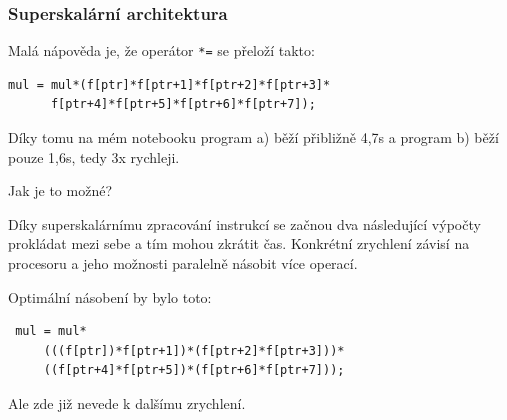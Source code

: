 \documentclass{beamer}
\begin{document}
\begin{frame}[fragile]
\frametitle{Superskalární architektura}

Malá nápověda je, že operátor \texttt{*=} se přeloží takto:
\begin{verbatim}
mul = mul*(f[ptr]*f[ptr+1]*f[ptr+2]*f[ptr+3]*
      f[ptr+4]*f[ptr+5]*f[ptr+6]*f[ptr+7]);
\end{verbatim}

Díky tomu na mém notebooku program a) běží přibližně 4,7s a program b) běží pouze 1,6s, tedy 3x rychleji.
\bigskip

Jak je to možné?
\bigskip

Díky superskalárnímu zpracování instrukcí se začnou dva následující výpočty prokládat mezi sebe a tím mohou zkrátit čas. Konkrétní zrychlení závisí na procesoru a jeho možnosti paralelně násobit více operací.
\bigskip

Optimální násobení by bylo toto:
\begin{verbatim}
 mul = mul*
     (((f[ptr])*f[ptr+1])*(f[ptr+2]*f[ptr+3]))*
     ((f[ptr+4]*f[ptr+5])*(f[ptr+6]*f[ptr+7]));
\end{verbatim}
Ale zde již nevede k dalšímu zrychlení.

\end{frame}
\end{document}
